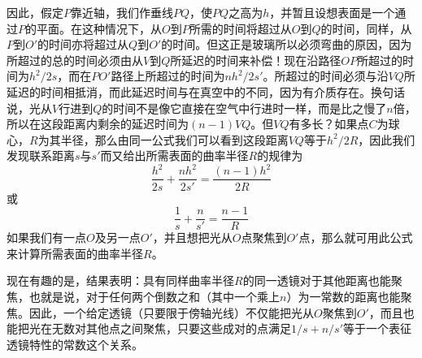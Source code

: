 因此，假定$P$靠近轴，我们作垂线$PQ$，使$PQ$之高为$h$，并暂且设想表面是一个通过$P$的平面。在这种情况下，从$O$到$P$所需的时间将超过从$O$到$Q$的时间，同样，从$P$到$O'$的时间亦将超过从$Q$到$O'$的时间。但这正是玻璃所以必须弯曲的原因，因为所超过的总的时间必须由从$V$到$Q$所延迟的时间来补偿！现在沿路径$OP$所超过的时间为$h^2/2s$，而在$PO'$路径上所超过的时间为$nh^2/2s'$。所超过的时间必须与沿$VQ$所延迟的时间相抵消，而此延迟时间与在真空中的不同，因为有介质存在。换句话说，光从$V$行进到$Q$的时间不是像它直接在空气中行进时一样，而是比之慢了$n$倍，所以在这段距离内剩余的延迟时间为$(n-1)VQ$。但$VQ$有多长？如果点$C$为球心，$R$为其半径，那么由同一公式我们可以看到这段距离$VQ$等于$h^2/2R$，因此我们发现联系距离$s$与$s'$而又给出所需表面的曲率半径$R$的规律为
\begin{equation}
    \label{Eq:I:27:2}
    \frac{h^2}{2s} + \frac{nh^2}{2s'} = \frac{(n-1)h^2}{2R}
\end{equation}
或
\begin{equation}
    \label{Eq:I:27:3}
    \frac{1}{s} + \frac{n}{s'} = \frac{n-1}{R}
\end{equation}
如果我们有一点$O$及另一点$O'$，并且想把光从$O$点聚焦到$O'$点，那么就可用此公式来计算所需表面的曲率半径$R$。

现在有趣的是，结果表明：具有同样曲率半径$R$的同一透镜对于其他距离也能聚焦，也就是说，对于任何两个倒数之和（其中一个乘上$n$）为一常数的距离也能聚焦。因此，一个给定透镜（只要限于傍轴光线）不仅能把光从$O$聚焦到$O'$，而且也能把光在无数对其他点之间聚焦，只要这些成对的点满足$1/s+n/s'$等于一个表征透镜特性的常数这个关系。

